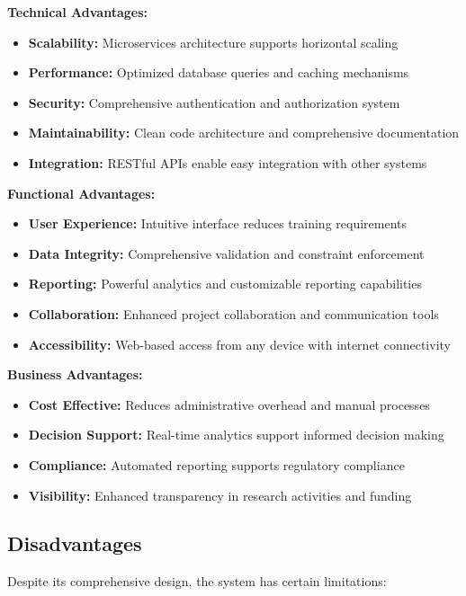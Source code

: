 \documentclass[12pt,a4paper]{article}
\begin{document}
\textbf{Technical Advantages:}
\begin{itemize}
    \item \textbf{Scalability:} Microservices architecture supports horizontal scaling
    \item \textbf{Performance:} Optimized database queries and caching mechanisms
    \item \textbf{Security:} Comprehensive authentication and authorization system
    \item \textbf{Maintainability:} Clean code architecture and comprehensive documentation
    \item \textbf{Integration:} RESTful APIs enable easy integration with other systems
\end{itemize}

\textbf{Functional Advantages:}
\begin{itemize}
    \item \textbf{User Experience:} Intuitive interface reduces training requirements
    \item \textbf{Data Integrity:} Comprehensive validation and constraint enforcement
    \item \textbf{Reporting:} Powerful analytics and customizable reporting capabilities
    \item \textbf{Collaboration:} Enhanced project collaboration and communication tools
    \item \textbf{Accessibility:} Web-based access from any device with internet connectivity
\end{itemize}

\textbf{Business Advantages:}
\begin{itemize}
    \item \textbf{Cost Effective:} Reduces administrative overhead and manual processes
    \item \textbf{Decision Support:} Real-time analytics support informed decision making
    \item \textbf{Compliance:} Automated reporting supports regulatory compliance
    \item \textbf{Visibility:} Enhanced transparency in research activities and funding
\end{itemize}

\subsection{Disadvantages}
Despite its comprehensive design, the system has certain limitations:
\end{document}
